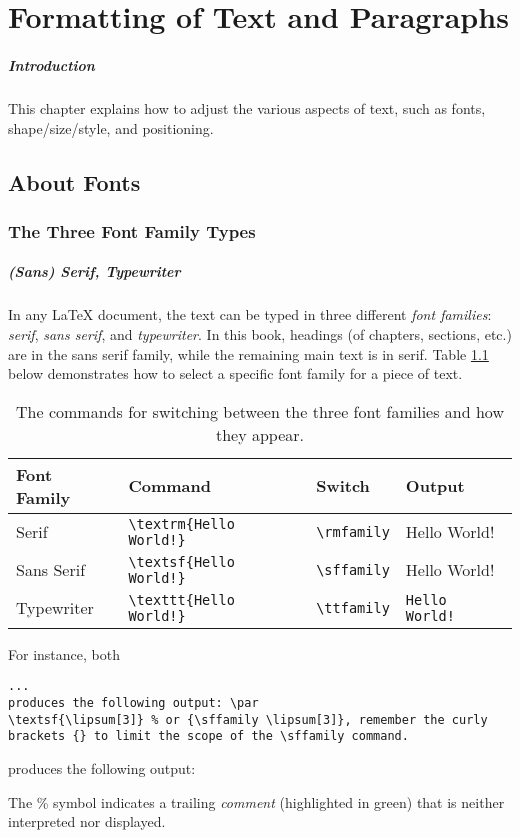 \chapter{Formatting of Text and Paragraphs}

\paragraph{Introduction} This chapter explains how to adjust the various aspects of text, such as fonts, shape/size/style, and positioning.

\section{About Fonts}

\subsection{The Three Font Family Types}

\paragraph{(Sans) Serif, Typewriter} In any \LaTeX{} document, the text can be typed in three different \textit{font families}: \textit{serif}, \textit{sans serif}, and \textit{typewriter}. In this book, headings (of chapters, sections, etc.) are in the sans serif family, while the remaining main text is in serif. Table \ref{tab:fontfamily} below demonstrates how to select a specific font family for a piece of text.
\begin{table}
\begin{tabularx}{\textwidth}{|l|X|l|l|}
\hline
Font Family & Command & Switch & Output \\
\hline
Serif & \texttt{\textbackslash textrm\{Hello World!\}}& \texttt{\textbackslash rmfamily} & \textrm{Hello World!} \\
\hline
Sans Serif & \texttt{\textbackslash textsf\{Hello World!\}}& \texttt{\textbackslash sffamily} & \textsf{Hello World!} \\
\hline
Typewriter & \texttt{\textbackslash texttt\{Hello World!\}}& \texttt{\textbackslash ttfamily} & \texttt{Hello World!} \\
\hline
\end{tabularx}
\caption{The commands for switching between the three font families and how they appear.}
\label{tab:fontfamily}
\end{table}
For instance, both
\begin{lstlisting}
... 
produces the following output: \par
\textsf{\lipsum[3]} % or {\sffamily \lipsum[3]}, remember the curly brackets {} to limit the scope of the \sffamily command.
\end{lstlisting}
produces the following output: \par
{\sffamily \lipsum[3]} \par
The \% symbol indicates a trailing \textit{comment} (highlighted in green) that is neither interpreted nor displayed.

